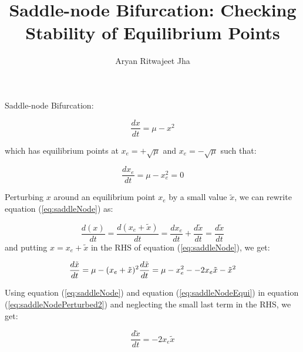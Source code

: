 \documentclass{article}
\begin{document}
	
	\title{Saddle-node Bifurcation: Checking Stability of Equilibrium Points}
	\author{Aryan Ritwajeet Jha}
	\maketitle
	
	Saddle-node Bifurcation:
	
	\begin{equation}
		\label{eq:saddleNode}
		\frac{dx}{dt} = \mu - x^2
	\end{equation}
	
	which has equilibrium points at $x_{e} = +\sqrt\mu$ and $x_{e} = -\sqrt\mu$ such that:
	
	\begin{equation}
		\label{eq:saddleNodeEqui}
		\frac{dx_e}{dt} = \mu - x_e^2 = 0 
	\end{equation}
	
	
	Perturbing $x$ around an equilibrium point $x_e$ by a small value $\tilde x$, we can rewrite equation (\ref{eq:saddleNode}) as:
	
	\begin{equation}
		\label{eq:saddleNodePerturbed}
		\frac{d(x)}{dt} = \frac{d(x_e + \tilde x)}{dt} =\frac{dx_e}{dt} + \frac{d \tilde x}{dt} = \frac{d \tilde x}{dt} 
	\end{equation}
	and putting $x = x_e + \tilde x$ in the RHS of equation (\ref{eq:saddleNode}), we get:
	
	\begin{equation}
		\label{eq:saddleNodePerturbed2}
		\frac{d\tilde x}{dt} = \mu - (x_e+\tilde x)^2 \\
		\frac{d\tilde x}{dt} = \mu - x_e^2 - -2x_e\tilde x - \tilde x^2
	\end{equation}
	
	Using equation (\ref{eq:saddleNode}) and equation (\ref{eq:saddleNodeEqui}) in equation (\ref{eq:saddleNodePerturbed2}) and neglecting the small last term in the RHS, we get:
	
	\begin{equation}
		\frac{d\tilde x}{dt} = -2x_e\tilde x
	\end{equation}
\end{document}
